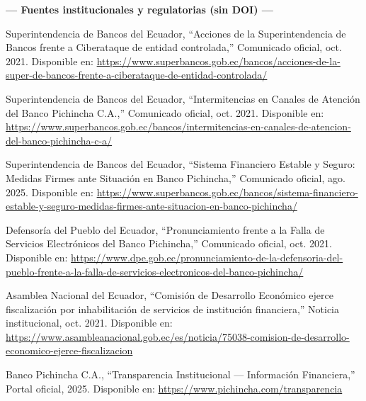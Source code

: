 \documentclass[12pt,a4paper]{article}
\begin{document}
\vspace{0.5cm}
\noindent\textbf{\color{azulP}--- Fuentes institucionales y regulatorias (sin DOI) ---}
\vspace{0.2cm}

\begin{enumerate}[leftmargin=0.6cm, label={[\arabic*]},
                  start=11, itemsep=6pt]

  \item Superintendencia de Bancos del Ecuador,
        ``Acciones de la Superintendencia de Bancos frente a Ciberataque de
        entidad controlada,'' Comunicado oficial, oct. 2021.
        Disponible en:
        \url{https://www.superbancos.gob.ec/bancos/acciones-de-la-super-de-bancos-frente-a-ciberataque-de-entidad-controlada/}

  \item Superintendencia de Bancos del Ecuador,
        ``Intermitencias en Canales de Atenci\'on del Banco Pichincha C.A.,''
        Comunicado oficial, oct. 2021.
        Disponible en:
        \url{https://www.superbancos.gob.ec/bancos/intermitencias-en-canales-de-atencion-del-banco-pichincha-c-a/}

  \item Superintendencia de Bancos del Ecuador,
        ``Sistema Financiero Estable y Seguro: Medidas Firmes ante Situaci\'on
        en Banco Pichincha,'' Comunicado oficial, ago. 2025.
        Disponible en:
        \url{https://www.superbancos.gob.ec/bancos/sistema-financiero-estable-y-seguro-medidas-firmes-ante-situacion-en-banco-pichincha/}

  \item Defensor\'ia del Pueblo del Ecuador,
        ``Pronunciamiento frente a la Falla de Servicios Electr\'onicos del
        Banco Pichincha,'' Comunicado oficial, oct. 2021.
        Disponible en:
        \url{https://www.dpe.gob.ec/pronunciamiento-de-la-defensoria-del-pueblo-frente-a-la-falla-de-servicios-electronicos-del-banco-pichincha/}

  \item Asamblea Nacional del Ecuador,
        ``Comisi\'on de Desarrollo Econ\'omico ejerce fiscalizaci\'on por
        inhabilitaci\'on de servicios de instituci\'on financiera,''
        Noticia institucional, oct. 2021.
        Disponible en:
        \url{https://www.asambleanacional.gob.ec/es/noticia/75038-comision-de-desarrollo-economico-ejerce-fiscalizacion}

  \item Banco Pichincha C.A.,
        ``Transparencia Institucional --- Informaci\'on Financiera,''
        Portal oficial, 2025.
        Disponible en: \url{https://www.pichincha.com/transparencia}

\end{enumerate}
\end{document}
